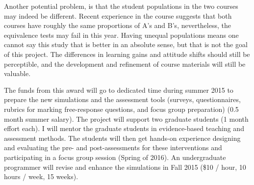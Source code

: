 \documentclass[10pt,letterpaper]{article}
\begin{document}
{Another potential problem, is that the student populations in the two courses may indeed be different. Recent experience in the course suggests that both courses have roughly the same proportions of A's and B's, nevertheless, the equivalence tests may fail in this year. Having unequal populations means one cannot say this study  that \pogil is better in an absolute sense, but that is not the goal of this project. The differences in learning gains and attitude shifts should still be perceptible, and the development and refinement of course materials will still be valuable.


The funds from this award will go to dedicated time during summer 2015 to prepare the new simulations and the assessment tools (surveys, questionnaires, rubrics for marking free-response questions, and focus group preparation) (0.5 month summer salary). The project will support two graduate students (1 month effort each). I will mentor the graduate students in evidence-based teaching and assessment methods. The students will then get hands-on experience designing and evaluating the pre- and post-assessments for these interventions and participating in a focus group session (Spring of 2016). An undergraduate programmer will revise and enhance the simulations in Fall 2015 (\$10 / hour, 10 hours / week, 15 weeks).
}%
\newpage
\raggedright\footnotesize\singlespacing
\renewcommand{\refname}{\large\textbf{References}}


% 

% 
\end{document}
